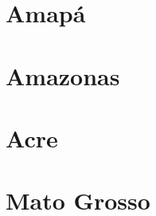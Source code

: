 \documentclass[8pt]{beamer}
\begin{document}
\begin{frame}[label=amzcnae2dig]{}
\textit{\hyperlink{indice_principal}{}}

\end{frame}

\section{Amapá}

\begin{frame}[label=amzapcod2dig]{}
\textit{\hyperlink{indice_principal}{}}

\end{frame}

\begin{frame}[label=amzapcnae2dig]{}
\textit{\hyperlink{indice_principal}{}}

\end{frame}

\section{Amazonas}

\begin{frame}[label=amzamcod2dig]{}
\textit{\hyperlink{indice_principal}{}}

\end{frame}

\begin{frame}[label=amzamcnae2dig]{}
\textit{\hyperlink{indice_principal}{}}

\end{frame}

\section{Acre}


\begin{frame}[label=amzaccod2dig]{}
\textit{\hyperlink{indice_principal}{}}

\end{frame}

\begin{frame}[label=amzaccnae2dig]{}
\textit{\hyperlink{indice_principal}{}}

\end{frame}

\section{Mato Grosso}
\end{document}

